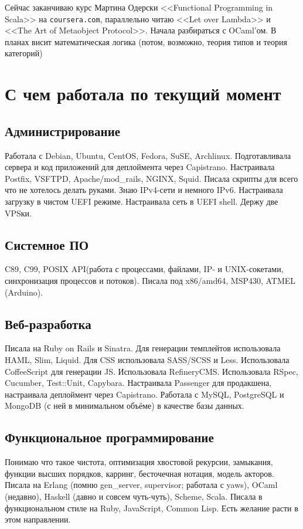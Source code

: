 \documentclass[14pt,a4paper]{extarticle}
\begin{document}
Сейчас заканчиваю курс Мартина Одерски <<Functional Programming in
Scala>> на {\tt coursera.com}, параллельно читаю <<Let over Lambda>> и
<<The Art of Metaobject Protocol>>. Начала разбираться с OCaml'ом. В
планах висит математическая логика (потом, возможно, теория типов и теория
категорий)

\section*{С чем работала по текущий момент}

\subsection*{Администрирование}

Работала с Debian, Ubuntu, CentOS, Fedora, SuSE,
Archlinux. Подготавливала сервера и код приложений для деплоймента через
Capistrano. Настраивала Postfix, VSFTPD, Apache/mod\_rails, NGINX,
Squid. Писала скрипты для всего что не хотелось делать
руками. Знаю IPv4-сети и немного IPv6. Настраивала загрузку в чистом
UEFI режиме. Настраивала сеть в UEFI shell. Держу две VPSки.

\subsection*{Системное ПО}

C89, C99, POSIX API(работа с процессами, файлами, IP- и UNIX-сокетами,
синхронизация процессов и потоков). Писала под x86/amd64, MSP430, ATMEL (Arduino).

\subsection*{Веб-разработка}

Писала на Ruby on Rails и Sinatra. Для генерации темплейтов использовала
HAML, Slim, Liquid. Для CSS использовала SASS/SCSS и Less. Использовала
CoffeeScript для генерации JS. Использовала RefineryCMS. Использовала
RSpec, Cucumber, Test::Unit, Capybara. Настраивала Passenger для
продакшена, настраивала деплоймент через Capistrano. Работала с MySQL,
PostgreSQL и MongoDB (с ней в минимальном объёме) в качестве базы
данных.

\subsection*{Функциональное программирование}

Понимаю что такое чистота, оптимизация хвостовой рекурсии, замыкания,
функции высших порядков, карринг, бесточечная нотация, модель акторов.
Писала на Erlang (помню gen\_server, supervisor; работала с yaws), OCaml (недавно),
Haskell (давно и совсем чуть-чуть), Scheme, Scala. Писала в функциональном стиле
на Ruby, JavaScript, Common Lisp. Есть желание расти в этом направлении.
\end{document}
